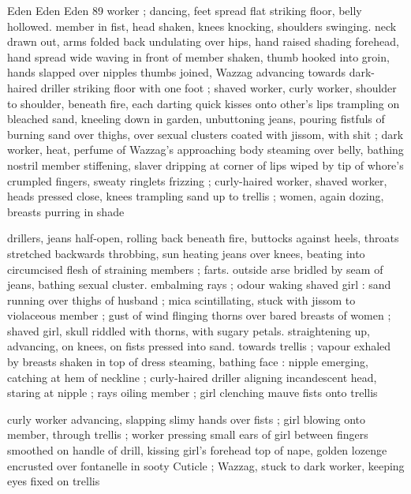 Eden Eden Eden 89
worker ; dancing, feet spread flat striking floor, belly hollowed.
member in fist, head shaken, knees knocking, shoulders swinging.
neck drawn out, arms folded back undulating over hips, hand raised
shading forehead, hand spread wide waving in front of member
shaken, thumb hooked into groin, hands slapped over nipples
thumbs joined, Wazzag advancing towards dark-haired driller striking
floor with one foot ; shaved worker, curly worker, shoulder to
shoulder, beneath fire, each darting quick kisses onto other's lips
trampling on bleached sand, kneeling down in garden, unbuttoning
jeans, pouring fistfuls of burning sand over thighs, over sexual
clusters coated with jissom, with shit ; dark worker, heat, perfume of
Wazzag's approaching body steaming over belly, bathing nostril
member stiffening, slaver dripping at corner of lips wiped by tip of
whore's crumpled fingers, sweaty ringlets frizzing ; curly-haired
worker, shaved worker, heads pressed close, knees trampling sand
up to trellis ; women, again dozing, breasts purring in shade

drillers, jeans half-open, rolling back beneath fire, buttocks against
heels, throats stretched backwards throbbing, sun heating jeans over
knees, beating into circumcised flesh of straining members ; farts.
outside arse bridled by seam of jeans, bathing sexual cluster.
embalming rays ; odour waking shaved girl : sand running over
thighs of husband ; mica scintillating, stuck with jissom to violaceous
member ; gust of wind flinging thorns over bared breasts of women
; shaved girl, skull riddled with thorns, with sugary petals.
straightening up, advancing, on knees, on fists pressed into sand.
towards trellis ; vapour exhaled by breasts shaken in top of dress
steaming, bathing face : nipple emerging, catching at hem of
neckline ; curly-haired driller aligning incandescent head, staring at
nipple ; rays oiling member ; girl clenching mauve fists onto trellis

curly worker advancing, slapping slimy hands over fists ; girl blowing
onto member, through trellis ; worker pressing small ears of girl
between fingers smoothed on handle of drill, kissing girl's forehead
top of nape, golden lozenge encrusted over fontanelle in sooty
Cuticle ; Wazzag, stuck to dark worker, keeping eyes fixed on trellis

